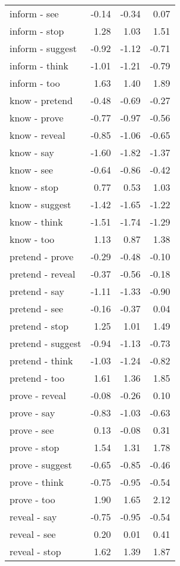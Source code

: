 \begin{longtable}{lrrr}
  inform - see & -0.14 & -0.34 & 0.07 \\ 
  inform - stop & 1.28 & 1.03 & 1.51 \\ 
  inform - suggest & -0.92 & -1.12 & -0.71 \\ 
  inform - think & -1.01 & -1.21 & -0.79 \\ 
  inform - too & 1.63 & 1.40 & 1.89 \\ 
  know - pretend & -0.48 & -0.69 & -0.27 \\ 
  know - prove & -0.77 & -0.97 & -0.56 \\ 
  know - reveal & -0.85 & -1.06 & -0.65 \\ 
  know - say & -1.60 & -1.82 & -1.37 \\ 
  know - see & -0.64 & -0.86 & -0.42 \\ 
  know - stop & 0.77 & 0.53 & 1.03 \\ 
  know - suggest & -1.42 & -1.65 & -1.22 \\ 
  know - think & -1.51 & -1.74 & -1.29 \\ 
  know - too & 1.13 & 0.87 & 1.38 \\ 
  pretend - prove & -0.29 & -0.48 & -0.10 \\ 
  pretend - reveal & -0.37 & -0.56 & -0.18 \\ 
  pretend - say & -1.11 & -1.33 & -0.90 \\ 
  pretend - see & -0.16 & -0.37 & 0.04 \\ 
  pretend - stop & 1.25 & 1.01 & 1.49 \\ 
  pretend - suggest & -0.94 & -1.13 & -0.73 \\ 
  pretend - think & -1.03 & -1.24 & -0.82 \\ 
  pretend - too & 1.61 & 1.36 & 1.85 \\ 
  prove - reveal & -0.08 & -0.26 & 0.10 \\ 
  prove - say & -0.83 & -1.03 & -0.63 \\ 
  prove - see & 0.13 & -0.08 & 0.31 \\ 
  prove - stop & 1.54 & 1.31 & 1.78 \\ 
  prove - suggest & -0.65 & -0.85 & -0.46 \\ 
  prove - think & -0.75 & -0.95 & -0.54 \\ 
  prove - too & 1.90 & 1.65 & 2.12 \\ 
  reveal - say & -0.75 & -0.95 & -0.54 \\ 
  reveal - see & 0.20 & 0.01 & 0.41 \\ 
  reveal - stop & 1.62 & 1.39 & 1.87 \\ 

\end{longtable}
